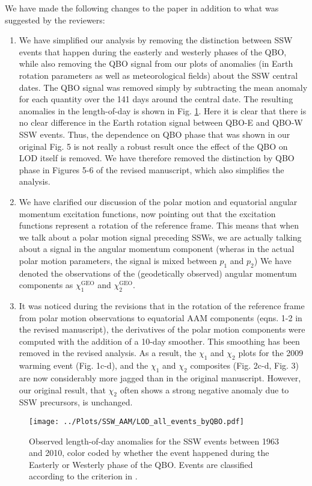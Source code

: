 \documentclass[a4paper,10pt]{article}
\begin{document}
We have made the following changes to the paper in addition to what was suggested by the reviewers:
\begin{enumerate}
 \item We have simplified our analysis by removing the distinction between SSW events that happen during the easterly and westerly phases of the QBO, while also removing the QBO signal from our plots of anomalies (in Earth rotation parameters as well as meteorological fields) about the SSW central dates. The QBO signal was removed simply by subtracting the mean anomaly for each quantity over the 141 days around the central date.  The resulting anomalies in the length-of-day is shown in Fig. \ref{fig:LOD_by_QBO}.  Here it is clear that there is no clear difference in the Earth rotation signal between QBO-E and QBO-W SSW events.  Thus, the dependence on QBO phase that was shown  in our original Fig. 5 is not really a robust result once the effect of the QBO on LOD itself is removed.  We have therefore removed the distinction by QBO phase in Figures 5-6 of the revised manuscript, which also simplifies the analysis.
 \item We have clarified our discussion of the polar motion and equatorial angular momentum excitation functions, now pointing out that the excitation functions represent a rotation of the reference frame.  This means that when we talk about a polar motion signal preceding SSWs, we are actually talking about a signal in the angular momentum component  (wheras in the actual polar motion parameters, the signal is mixed between $p_1$ and $p_2$)  We have denoted the observations of the (geodetically observed) angular momentum components as $\chi_1^{\text{GEO}}$ and  $\chi_2^{\text{GEO}}$. 
\item It was noticed during the revisions that in the rotation of the reference frame from polar motion observations to equatorial AAM components (eqns. 1-2 in the revised manuscript), the derivatives of the polar motion components were computed with the addition of a 10-day smoother.  This smoothing has been removed in the revised analysis.  As a result, the $\chi_1$ and $\chi_2$ plots for the 2009 warming event (Fig. 1c-d), and the $\chi_1$ and $\chi_2$ composites (Fig. 2c-d, Fig. 3) are now considerably more jagged than in the original manuscript.  However, our original result, that $\chi_2$ often shows a strong negative anomaly due to SSW precursors, is unchanged.
\end{enumerate}

\begin{figure}
  \noindent
\texttt{[image: ../Plots/SSW\_AAM/LOD\_all\_events\_byQBO.pdf]}
   \caption{Observed length-of-day anomalies for the SSW events between 1963 and 2010, color coded by whether the event happened during the Easterly or Westerly phase of the QBO. Events are classified according to the criterion in \cite{Hansen2013}.}
   \label{fig:LOD_by_QBO}
 \end{figure}


\end{document}
